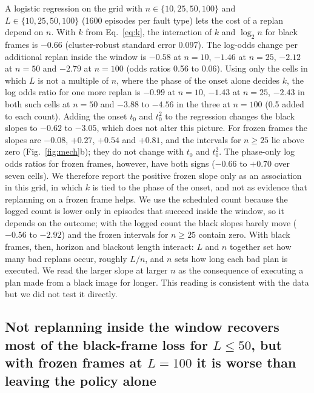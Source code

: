 \documentclass[11pt]{article}
\begin{document}
A logistic regression on the grid with $n\in\{10,25,50,100\}$ and $L\in\{10,25,50,100\}$ (1600 episodes per fault type) lets the cost of a replan depend on $n$. With $k$ from Eq.~\ref{eq:k}, the interaction of $k$ and $\log_2 n$ for black frames is $-0.66$ (cluster-robust standard error 0.097). The log-odds change per additional replan inside the window is $-0.58$ at $n{=}10$, $-1.46$ at $n{=}25$, $-2.12$ at $n{=}50$ and $-2.79$ at $n{=}100$ (odds ratios 0.56 to 0.06). Using only the cells in which $L$ is not a multiple of $n$, where the phase of the onset alone decides $k$, the log odds ratio for one more replan is $-0.99$ at $n{=}10$, $-1.43$ at $n{=}25$, $-2.43$ in both such cells at $n{=}50$ and $-3.88$ to $-4.56$ in the three at $n{=}100$ (0.5 added to each count). Adding the onset $t_0$ and $t_0^2$ to the regression changes the black slopes to $-0.62$ to $-3.05$, which does not alter this picture. For frozen frames the slopes are $-0.08$, $+0.27$, $+0.54$ and $+0.81$, and the intervals for $n\ge25$ lie above zero (Fig.~\ref{fig:mech}b); they do not change with $t_0$ and $t_0^2$. The phase-only log odds ratios for frozen frames, however, have both signs ($-0.66$ to $+0.70$ over seven cells). We therefore report the positive frozen slope only as an association in this grid, in which $k$ is tied to the phase of the onset, and not as evidence that replanning on a frozen frame helps. We use the scheduled count because the logged count is lower only in episodes that succeed inside the window, so it depends on the outcome; with the logged count the black slopes barely move ($-0.56$ to $-2.92$) and the frozen intervals for $n\ge25$ contain zero. With black frames, then, horizon and blackout length interact: $L$ and $n$ together set how many bad replans occur, roughly $L/n$, and $n$ sets how long each bad plan is executed. We read the larger slope at larger $n$ as the consequence of executing a plan made from a black image for longer. This reading is consistent with the data but we did not test it directly.

\subsection{Not replanning inside the window recovers most of the black-frame loss for $L\le50$, but with frozen frames at $L{=}100$ it is worse than leaving the policy alone}
\label{sec:res-hold}
\end{document}
